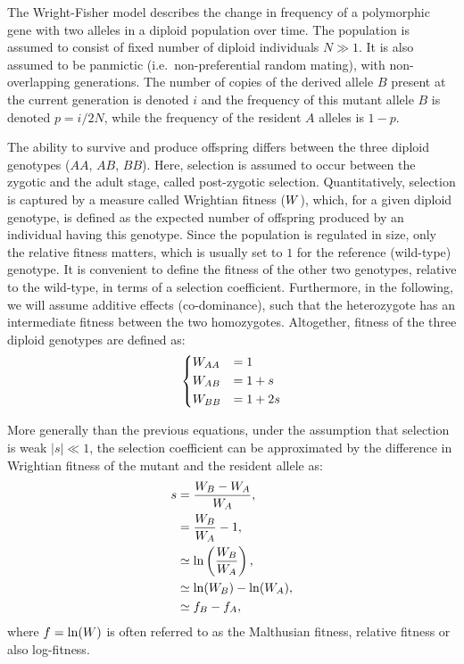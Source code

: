 The Wright-Fisher model describes the change in frequency of a \gls{polymorphic} gene with two \glspl{allele} in a \gls{diploid} population over time.
The population is assumed to consist of fixed number of \gls{diploid} individuals $N \gg 1$.
It is also assumed to be panmictic (i.e.~non-preferential random mating), with non-overlapping generations.
The number of copies of the derived \gls{allele} $B$ present at the current generation is denoted $i$ and the frequency of this mutant \gls{allele} $B$ is denoted $p = i/2N$, while the frequency of the resident $A$ \glspl{allele} is $1 - p$.

The ability to survive and produce offspring differs between the three \gls{diploid} genotypes ($AA$, $AB$, $BB$).
Here, selection is assumed to occur between the zygotic and the adult stage, called post-zygotic selection.
Quantitatively, selection is captured by a measure called Wrightian fitness ($W$), which, for a given \gls{diploid} genotype, is defined as the expected number of offspring produced by an individual having this genotype.
Since the population is regulated in size, only the relative fitness matters, which is usually set to $1$ for the reference (wild-type) genotype.
It is convenient to define the fitness of the other two genotypes, relative to the wild-type, in terms of a selection coefficient.
Furthermore, in the following, we will assume additive effects (co-dominance), such that the heterozygote has an intermediate fitness between the two homozygotes.
Altogether, fitness of the three \gls{diploid} genotypes are defined as:
\begin{equation}
    \begin{dcases}
        W_{AA} & = 1 \\
        W_{AB} & = 1 + s \\
        W_{BB} & = 1 + 2s \\
    \end{dcases}
\end{equation}

More generally than the previous equations, under the assumption that selection is weak $|s| \ll 1$, the selection coefficient can be approximated by the difference in Wrightian fitness of the mutant and the resident \gls{allele} as:
\begin{align}
    s & = \dfrac{W_{B} - W_{A}}{W_{A}}, \\
    & = \dfrac{W_{B}}{W_{A}} - 1, \\
    & \simeq \ln\left( \dfrac{W_{B}}{W_{A}} \right), \\
    & \simeq \ln(W_{B}) - \ln(W_{A}), \\
    & \simeq f_{B} - f_{A},
\end{align}
where $f = \ln(W)$ is often referred to as the Malthusian fitness, relative fitness or also log-fitness.

